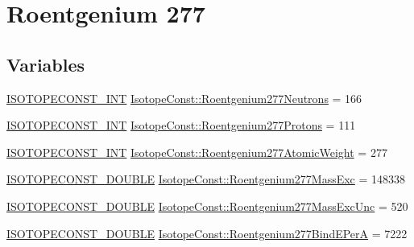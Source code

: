 \hypertarget{group___isotope_const-_roentgenium-_rg277}{}\section{Roentgenium 277}
\label{group___isotope_const-_roentgenium-_rg277}
\subsection*{Variables}
\begin{DoxyCompactItemize}
\item 
\mbox{\hyperlink{group___isotope_const-_macros_ga5f18360b3e99483a35c32d789e62621c}{I\+S\+O\+T\+O\+P\+E\+C\+O\+N\+S\+T\+\_\+\+I\+NT}} \mbox{\hyperlink{group___isotope_const-_roentgenium-_rg277_gaa5d1c76f86c0a4917a4c993bed3d7424}{Isotope\+Const\+::\+Roentgenium277\+Neutrons}} = 166
\item 
\mbox{\hyperlink{group___isotope_const-_macros_ga5f18360b3e99483a35c32d789e62621c}{I\+S\+O\+T\+O\+P\+E\+C\+O\+N\+S\+T\+\_\+\+I\+NT}} \mbox{\hyperlink{group___isotope_const-_roentgenium-_rg277_ga45870d068fcf4763cb69db182efcce40}{Isotope\+Const\+::\+Roentgenium277\+Protons}} = 111
\item 
\mbox{\hyperlink{group___isotope_const-_macros_ga5f18360b3e99483a35c32d789e62621c}{I\+S\+O\+T\+O\+P\+E\+C\+O\+N\+S\+T\+\_\+\+I\+NT}} \mbox{\hyperlink{group___isotope_const-_roentgenium-_rg277_gaeef2d40c71770aba21d7a8491880c309}{Isotope\+Const\+::\+Roentgenium277\+Atomic\+Weight}} = 277
\item 
\mbox{\hyperlink{group___isotope_const-_macros_ga8f45a7272ce02c0b4c65c44636ed719a}{I\+S\+O\+T\+O\+P\+E\+C\+O\+N\+S\+T\+\_\+\+D\+O\+U\+B\+LE}} \mbox{\hyperlink{group___isotope_const-_roentgenium-_rg277_gaf51210c0df57066ad68005562178900c}{Isotope\+Const\+::\+Roentgenium277\+Mass\+Exc}} = 148338
\item 
\mbox{\hyperlink{group___isotope_const-_macros_ga8f45a7272ce02c0b4c65c44636ed719a}{I\+S\+O\+T\+O\+P\+E\+C\+O\+N\+S\+T\+\_\+\+D\+O\+U\+B\+LE}} \mbox{\hyperlink{group___isotope_const-_roentgenium-_rg277_gaa77a6ccb0b977bdf16807faf0706dc40}{Isotope\+Const\+::\+Roentgenium277\+Mass\+Exc\+Unc}} = 520
\item 
\mbox{\hyperlink{group___isotope_const-_macros_ga8f45a7272ce02c0b4c65c44636ed719a}{I\+S\+O\+T\+O\+P\+E\+C\+O\+N\+S\+T\+\_\+\+D\+O\+U\+B\+LE}} \mbox{\hyperlink{group___isotope_const-_roentgenium-_rg277_ga0e3295873be5c41bb2064925055c4dbf}{Isotope\+Const\+::\+Roentgenium277\+Bind\+E\+PerA}} = 7222

\end{DoxyCompactItemize}
